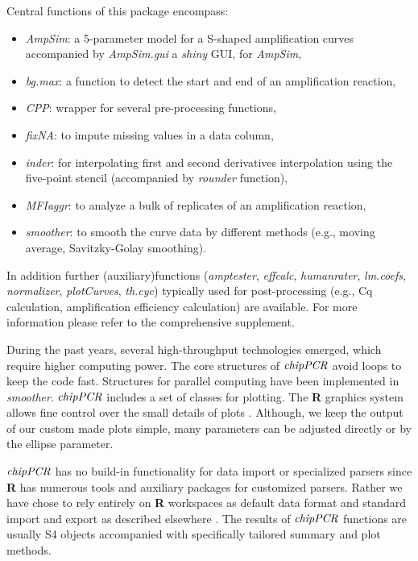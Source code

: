 \documentclass[twocolumn]{bmcart}%
\begin{document}
Central functions of this package encompass: 

\begin{itemize}
\item \textsl{AmpSim}: a 5-parameter model for a 
S-shaped amplification curves accompanied by \textsl{AmpSim.gui} a \emph{shiny} 
GUI, for \textsl{AmpSim},
\item \textsl{bg.max}: a function to detect the start and end of an 
amplification reaction,
\item \textsl{CPP}: wrapper for several pre-processing functions,
\item \textsl{fixNA}: to impute missing values in a data column,
\item \textsl{inder}: for interpolating first and second derivatives 
interpolation using the five-point stencil (accompanied by 
\textsl{rounder} function),
\item \textsl{MFIaggr}: to analyze a bulk of replicates of an amplification 
reaction, 
\item \textsl{smoother}: to smooth the curve data by different methods 
(e.g., moving average, Savitzky-Golay smoothing).
\end{itemize}

In addition further (auxiliary)functions (\textsl{amptester}, 
\textsl{effcalc}, \textsl{humanrater}, \textsl{lm.coefs}, \textsl{normalizer}, 
\textsl{plotCurves}, \textsl{th.cyc}) typically used for post-processing (e.g., 
Cq calculation, amplification efficiency calculation) are available. For more 
information please refer to the comprehensive supplement.

During the past years, several high-throughput technologies emerged, which 
require higher computing power. The core structures of $\emph{chipPCR}$ avoid 
loops to keep the code fast. Structures for parallel computing have been 
implemented in \textsl{smoother}. $\emph{chipPCR}$ includes a set of classes 
for plotting. The \textbf{R} graphics system allows fine control over the small 
details of plots \cite{Murrell_2012}. Although, we keep the output 
of our custom made plots simple, many parameters can be adjusted directly or by 
the ellipse parameter.

 $\emph{chipPCR}$ has no build-in functionality for data import or specialized 
parsers since \textbf{R} has numerous tools and auxiliary packages for customized 
parsers. Rather we have chose to rely entirely on \textbf{R} workspaces as 
default data format and standard import and export as described elsewhere 
\cite{RDCT2014c}. The results of $\emph{chipPCR}$ functions are usually S4 objects 
accompanied with specifically tailored summary and plot methods.
\end{document}

